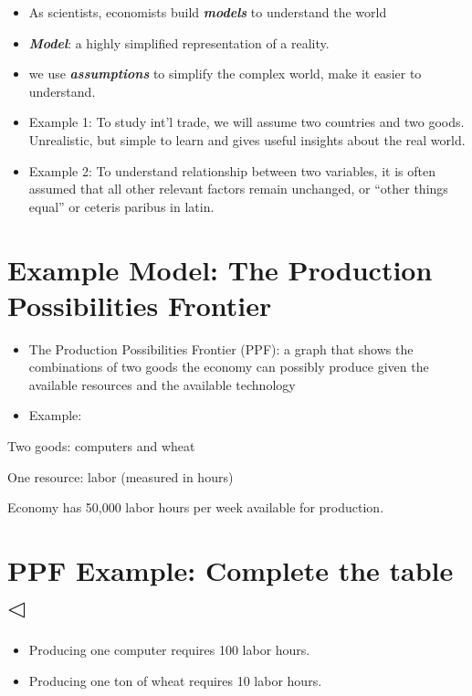 \documentclass[
]{book}
\begin{document}
\begin{itemize}
\item
  As scientists, economists build \textbf{\emph{models}} to understand the world
\item
  \textbf{\emph{Model}}: a highly simplified representation of a reality.
\item
  we use \textbf{\emph{assumptions}} to simplify the complex world, make it easier to understand.
\item
  Example 1: To study int'l trade, we will assume two countries and two goods. Unrealistic, but simple to learn and gives useful insights about the real world.
\item
  Example 2: To understand relationship between two variables, it is often assumed that all other relevant factors remain unchanged, or ``other things equal'' or ceteris paribus in latin.
\end{itemize}

\hypertarget{example-model-the-production-possibilities-frontier}{%
\section{Example Model: The Production Possibilities Frontier}\label{example-model-the-production-possibilities-frontier}}

\begin{itemize}
\item
  The Production Possibilities Frontier (PPF): a graph that shows the combinations of two goods the economy can possibly produce given the available resources and the available technology
\item
  Example:
\end{itemize}

Two goods: computers and wheat

One resource: labor (measured in hours)

Economy has 50,000 labor hours per week available for production.

\hypertarget{ppf-example-complete-the-table-triangleleft}{%
\section{\texorpdfstring{PPF Example: Complete the table \(\triangleleft\)}{PPF Example: Complete the table \textbackslash triangleleft}}\label{ppf-example-complete-the-table-triangleleft}}

\begin{itemize}
\item
  Producing one computer requires 100 labor hours.
\item
  Producing one ton of wheat requires 10 labor hours.
\end{itemize}
\end{document}
